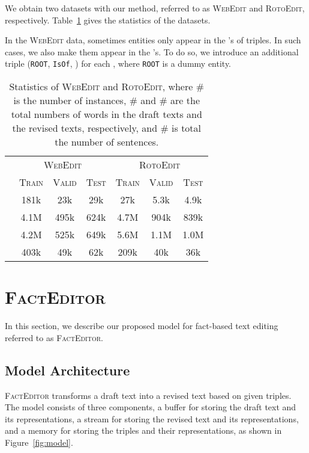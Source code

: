 \documentclass[11pt,a4paper]{article}
\begin{document}
We obtain two datasets with our method, referred to as \textsc{WebEdit} and \textsc{RotoEdit}, respectively.
Table~\ref{tab:stats} gives the statistics of the datasets.

In the \textsc{WebEdit} data, sometimes entities only appear in the 's of triples. In such cases, we also make them appear in the 's. To do so, we introduce an additional triple (\texttt{ROOT}, \texttt{IsOf}, ) for each , where \texttt{ROOT} is a dummy entity.

\begin{table}[t]
    \centering
    \footnotesize
    \begin{tabular}{@{}c|cccccc@{}}
        \toprule
         & \multicolumn{3}{c}{\textsc{WebEdit}} & \multicolumn{3}{c}{\textsc{RotoEdit}}\\
         & \textsc{\scriptsize{Train}} & \textsc{\scriptsize{Valid}} & \textsc{\scriptsize{Test}}& \textsc{\scriptsize{Train}} & \textsc{\scriptsize{Valid}} & \textsc{\scriptsize{Test}}\\
          \midrule
         & 181k & 23k & 29k & 27k & 5.3k & 4.9k\\
         & 4.1M & 495k & 624k & 4.7M & 904k & 839k\\
         & 4.2M & 525k & 649k & 5.6M & 1.1M & 1.0M\\
         & 403k & 49k & 62k & 209k  & 40k  & 36k \\
        \bottomrule
    \end{tabular}
    \caption{Statistics of \textsc{WebEdit} and \textsc{RotoEdit}, where \# is the number of instances, \# and \# are the total numbers of words in the draft texts and the revised texts, respectively, and \# is total the number of sentences.}
    \label{tab:stats}
\end{table}

\section{\textsc{FactEditor}}
\label{sec:model}
In this section, we describe our proposed model for fact-based text editing referred to as \textsc{FactEditor}.

\subsection{Model Architecture}

\textsc{FactEditor} transforms a draft text into a revised text based on given triples. The model consists of three components, a buffer for storing the draft text and its representations, a stream for storing the revised text and its representations, and a memory for storing the triples and their representations, as shown in Figure~\ref{fig:model}.
\end{document}
